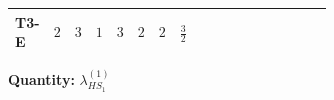 \documentclass[8pt]{article}
\begin{document}
\begin{landscape}
\begin{longtable}{@{}llcccccc >{\raggedright\arraybackslash}p{0.21\linewidth} >{\raggedright\arraybackslash}p{0.21\linewidth} >{\raggedright\arraybackslash}p{0.21\linewidth}@{}}
T3-E & $2$ & $3$ & $1$ & $3$ & $2$ & $2$ & $\frac{3}{2}$ & \scriptsize\adjustbox{max width=\linewidth}{$\begin{gathered} -\frac{33 {g_2}^2 {\lambda_{HS_1}^{(1)}}}{2}\end{gathered}$} & \scriptsize\adjustbox{max width=\linewidth}{$\begin{gathered} +3 {g_1}^4\end{gathered}$} & \scriptsize\adjustbox{max width=\linewidth}{$\begin{gathered} -\frac{15 {g_1}^2 {\lambda_{HS_1}^{(1)}}}{2}\end{gathered}$} \\
\midrule
\bottomrule
\end{longtable}
\clearpage
\noindent\textbf{Quantity: }$\lambda_{HS_1}^{(1)}$\par\smallskip

\end{landscape}
\end{document}

